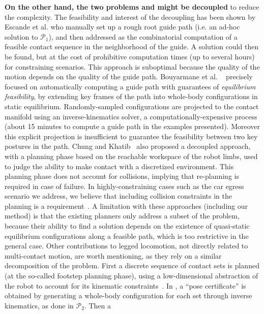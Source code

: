 \documentclass[journal]{IEEEtran}
\providecommand{\DIFaddtex}[1]{#1} %
\providecommand{\DIFaddbegin}{\protect\color{blue}} %
\providecommand{\DIFadd}[1]{\texorpdfstring{\DIFaddtex{#1}}{#1}} %
\begin{document}
\textbf{On the other hand, the two problems \Pa and \Pb might be decoupled} to reduce the complexity. The feasibility and interest of the decoupling has been shown by Escande et al. \cite{DBLP:conf/iser/EscandeKMG08} who manually set up a rough root guide path (i.e. an ad-hoc solution to $\mathcal{P}_1$), and then addressed \Pb as the combinatorial computation of a feasible contact sequence in the neighborhood of the guide. A solution could then be found, %
but at the cost of prohibitive computation times (up to several hours) for constraining scenarios. This approach is suboptimal because the quality of the motion depends on the quality of the guide path. Bouyarmane et al. ~\cite{Bouyarmane2009} precisely focused on automatically computing a guide path with guarantees of \textit{equilibrium feasibility}, by extending key frames of the path into whole-body configurations in static equilibrium. Randomly-sampled configurations are projected to the contact manifold using an inverse-kinematics solver, a computationally-expensive process (about 15 minutes to compute a guide path in the examples presented). Moreover this explicit projection is insufficient to guarantee the feasibility between two key postures in the path. Chung and Khatib~\cite{7140082} also proposed a decoupled approach, with a planning phase based on the reachable workspace of the robot limbs, used to judge the ability to make contact with a discretized environment. This planning phase does not account for collisions, implying that re-planning is required in case of failure. In highly-constraining cases such as the car egress scenario we address, we believe that including collision constraints in the planning is a requirement~\citep{tonneauisrr15,grey2017footstep}. \DIFaddbegin \DIFadd{A limitation with
these approaches (including our method) is that the existing planners only address a subset of the problem, because their ability to find a solution depends
on the existence of quasi-static equilibrium configurations along a feasible path, which is too restrictive in the general case. Other contributions to legged locomotion, not directly related to multi-contact motion, are worth mentioning, as they rely on a similar decomposition of the problem. First a discrete sequence 
of contact sets is planned (at the so-called footstep planning phase), using a low-dimensional abstraction of the robot to account for its kinematic constraints~\cite{6078435, doi:10.1177/0278364910392608}. In \cite{doi:10.1177/0278364910392608}, a ``pose certificate'' is obtained by generating a whole-body configuration for each set through inverse kinematics, as done in $\mathcal{P}_2$. Then a
}
\end{document}
